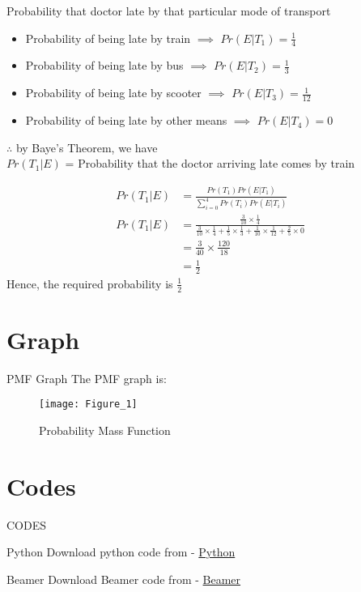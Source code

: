 \documentclass{beamer}
\begin{document}
\begin{frame}
Probability that doctor late by that particular mode of transport
\begin{itemize}
	\item Probability of being late by train $\implies$ $Pr(E|T_1) = \frac{1}{4}$
	\item Probability of being late by bus $\implies$ $Pr(E|T_2) = \frac{1}{3}$ 
	\item Probability of being late by scooter $\implies$ $Pr(E|T_3) = \frac{1}{12}$
	\item Probability of being late by other means $\implies$ $Pr(E|T_4) = 0$ \end{itemize}

\end{frame}

\begin{frame}
$\therefore$ by Baye's Theorem, we have \\
$Pr(T_1|E)$ = Probability that the doctor arriving late comes by train 

\begin{align}
Pr(T_1|E)& = \frac{Pr(T_1)Pr(E|T_1)}{\sum_{i=0}^4 Pr(T_i)Pr(E|T_i)} \\
Pr(T_1|E) &= \frac{\frac{3}{10}\times \frac{1}{4}}{\frac{3}{10}\times \frac{1}{4}+\frac{1}{5} \times \frac{1}{3}+\frac{1}{10} \times \frac{1}{12}+\frac{2}{5}\times 0} \\
&= \frac{3}{40}\times \frac{120}{18} \\
&= \frac{1}{2}
\end{align} 
Hence, the required probability is $\frac{1}{2}$
\end{frame}

\section{Graph}
\begin{frame}{PMF Graph}
The PMF graph is:
    \begin{figure}[!ht]
		\centering
		\texttt{[image: Figure\_1]}
		\caption{Probability Mass Function}
		\label{fig1}
	\end{figure}
\end{frame}


\section{Codes}
\begin{frame}{CODES}
    \begin{block}{Python}
         Download python code from - \href{https://github.com/jarpula-Bhanu/Assignment-6/blob/main/code/verify.py}{Python}
    \end{block}

 \begin{block}{Beamer}
         Download Beamer code from - \href{https://github.com/jarpula-Bhanu/Assignment-6/blob/main/Beamer.tex}{Beamer}
    \end{block}
\end{frame} 
\end{document}
